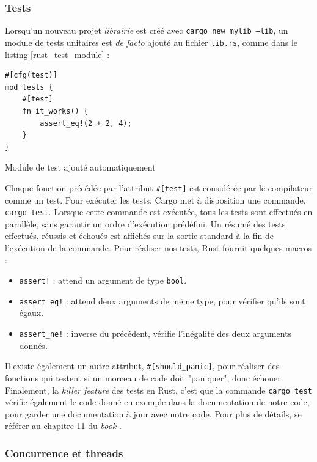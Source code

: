 \documentclass[a4paper, 12pt]{article}
\newenvironment{code}{\captionsetup{type=listing}}{}
\begin{document}
\subsubsection{Tests}
Lorsqu'un nouveau projet \textit{librairie} est créé avec \texttt{cargo new mylib --lib}, 
un module de tests unitaires est \textit{de facto} ajouté au fichier \texttt{lib.rs}, 
comme dans le listing \ref{rust_test_module} :
\bigbreak
\begin{code}
    \begin{verbatim}
#[cfg(test)]
mod tests {
    #[test]
    fn it_works() {
        assert_eq!(2 + 2, 4);
    }
}
    \end{verbatim}
    \caption{Module de test ajouté automatiquement}
    \label{rust_test_module}
\end{code}
\bigbreak
Chaque fonction précédée par l'attribut \texttt{#[test]} est considérée par le compilateur 
comme un test. Pour exécuter les tests, Cargo met à disposition une commande, \texttt{cargo test}. 
Lorsque cette commande est exécutée, tous les tests sont effectués en parallèle, sans garantir un 
ordre d'exécution prédéfini. Un résumé des tests effectués, réussis et échoués est affichés sur la 
sortie standard à la fin de l'exécution de la commande. Pour réaliser nos tests, Rust fournit 
quelques macros :
\begin{itemize}
    \item \texttt{assert!} : attend un argument de type \texttt{bool}.
    \item \texttt{assert_eq!} : attend deux arguments de même type, pour vérifier qu'ils sont égaux.
    \item \texttt{assert_ne!} : inverse du précédent, vérifie l'inégalité des deux arguments donnés.
\end{itemize}
Il existe également un autre attribut, \texttt{#[should_panic]}, pour réaliser des 
fonctions qui testent si un morceau de code doit "paniquer", donc échouer. Finalement, la 
\textit{killer feature} des tests en Rust, c'est que la commande \texttt{cargo test} 
vérifie également le code donné en exemple dans la documentation de notre code, pour garder une 
documentation à jour avec notre code.
Pour plus de détails, se référer au chapitre 11 du \textit{book} \cite{ref0}.

\subsubsection{Concurrence et threads}
\end{document}
